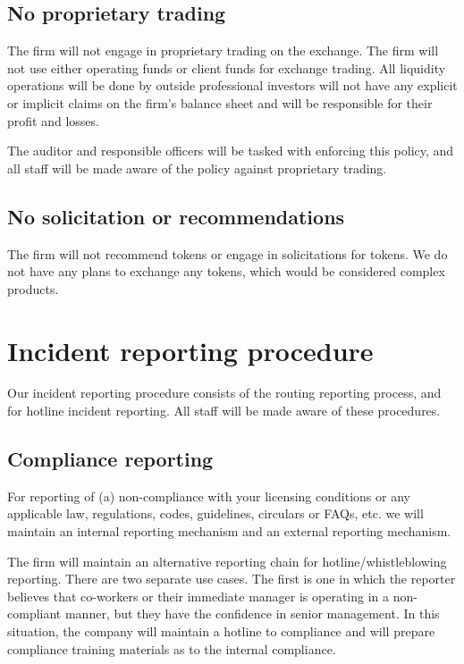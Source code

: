 \subsection{No proprietary trading}

The firm will not engage in proprietary trading on the exchange.  The firm will not use either operating funds or client funds for exchange
trading.  All liquidity operations will be done by outside
professional investors will not have any explicit or implicit claims
on the firm's balance sheet and will be responsible for their
profit and losses.

The auditor and responsible officers will be tasked with enforcing
this policy, and all staff will be made aware of the policy against
proprietary trading.

\subsection{No solicitation or recommendations}
The firm will not recommend tokens or engage in solicitations for
tokens.  We do not have any plans to exchange any tokens, which would
be considered complex products.

\section{Incident reporting procedure}

Our incident reporting procedure consists of the routing reporting
process, and for hotline incident reporting.  All staff will be
made aware of these procedures.

\subsection{Compliance reporting}

For reporting of (a) non-compliance with your licensing conditions or
any applicable law, regulations, codes, guidelines, circulars or
FAQs, etc. we will maintain an internal reporting mechanism and an
external reporting mechanism.

The firm will maintain an alternative reporting chain for
hotline/whistleblowing reporting.  There are two separate use cases.
The first is one in which the reporter believes that co-workers or
their immediate manager is operating in a non-compliant manner, but
they have the confidence in senior management.  In this situation, the
company will maintain a hotline to compliance and will prepare
compliance training materials as to the internal compliance.

